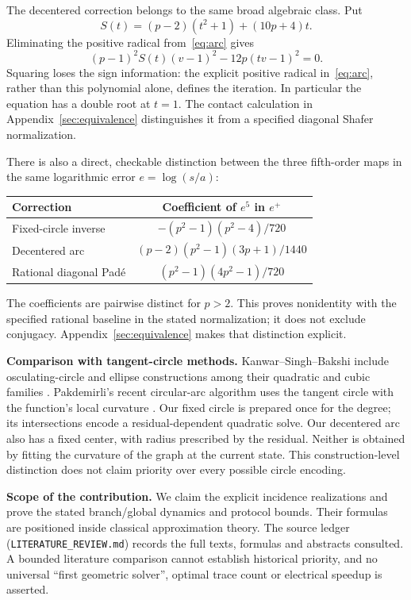\documentclass[11pt,a4paper]{article}
\begin{document}
The decentered correction belongs to the same broad algebraic class. Put
\[
 S(t)=(p-2)(t^2+1)+(10p+4)t.
\]
Eliminating the positive radical from~\eqref{eq:arc} gives
\begin{equation}\label{eq:arcimplicit}
 (p-1)^2 S(t)(v-1)^2-12p(tv-1)^2=0.
\end{equation}
Squaring loses the sign information: the explicit positive radical in~\eqref{eq:arc}, rather than this polynomial alone, defines the iteration. In particular the equation has a double root at $t=1$. The contact calculation in Appendix~\ref{sec:equivalence} distinguishes it from a specified diagonal Shafer normalization.

There is also a direct, checkable distinction between the three fifth-order maps in the same logarithmic error $e=\log(s/a)$:
\begin{center}\small
\begin{tabular}{@{}lc@{}}\toprule
Correction & Coefficient of $e^5$ in $e^+$\\\midrule
Fixed-circle inverse & $-(p^2-1)(p^2-4)/720$\\
Decentered arc & $(p-2)(p^2-1)(3p+1)/1440$\\
Rational diagonal Pad\'e & $(p^2-1)(4p^2-1)/720$\\\bottomrule
\end{tabular}
\end{center}
The coefficients are pairwise distinct for $p>2$. This proves nonidentity with the specified rational baseline in the stated normalization; it does not exclude conjugacy. Appendix~\ref{sec:equivalence} makes that distinction explicit.

\textbf{Comparison with tangent-circle methods.} Kanwar--Singh--Bakshi include osculating-circle and ellipse constructions among their quadratic and cubic families \cite{kanwar2008}. Pakdemirli's recent circular-arc algorithm uses the tangent circle with the function's local curvature \cite{pakdemirli2025}. Our fixed circle is prepared once for the degree; its intersections encode a residual-dependent quadratic solve. Our decentered arc also has a fixed center, with radius prescribed by the residual. Neither is obtained by fitting the curvature of the graph at the current state. This construction-level distinction does not claim priority over every possible circle encoding.

\textbf{Scope of the contribution.} We claim the explicit incidence realizations and prove the stated branch/global dynamics and protocol bounds. Their formulas are positioned inside classical approximation theory. The source ledger (\texttt{LITERATURE\_REVIEW.md}) records the full texts, formulas and abstracts consulted. A bounded literature comparison cannot establish historical priority, and no universal ``first geometric solver'', optimal trace count or electrical speedup is asserted.
\end{document}
